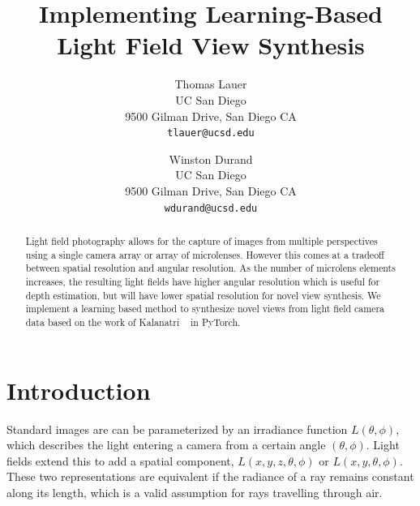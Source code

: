 \documentclass[10pt,twocolumn,letterpaper]{article}
\begin{document}
\title{Implementing Learning-Based Light Field View Synthesis}

\author{Thomas Lauer\\
UC San Diego\\
9500 Gilman Drive, San Diego CA\\
{\tt\small tlauer@ucsd.edu}
\and
Winston Durand\\
UC San Diego\\
9500 Gilman Drive, San Diego CA\\
{\tt\small wdurand@ucsd.edu}
}

\maketitle

\begin{abstract}
Light field photography allows for the capture of images from multiple
perspectives using a single camera array or array of microlenses. However
this comes at a tradeoff between spatial resolution and angular resolution.
As the number of microlens elements increases, the resulting light fields
have higher angular resolution which is useful for depth estimation,
but will have lower spatial resolution for novel view synthesis.
We implement a learning based method to synthesize novel views from light
field camera data based on the work of Kalanatri \etal~\cite{LearningViewSynthesis} in PyTorch.
\end{abstract}

\section{Introduction}

Standard images are can be parameterized by an irradiance function $L(\theta, \phi)$, which
describes the light entering a camera from a certain angle $(\theta, \phi)$. Light fields
extend this to add a spatial component, $L(x, y, z, \theta, \phi)$ or $L(x, y, \theta, \phi)$. 
These two representations are equivalent if the radiance of a ray remains constant along its length,
which is a valid assumption for rays travelling through air.
\end{document}
